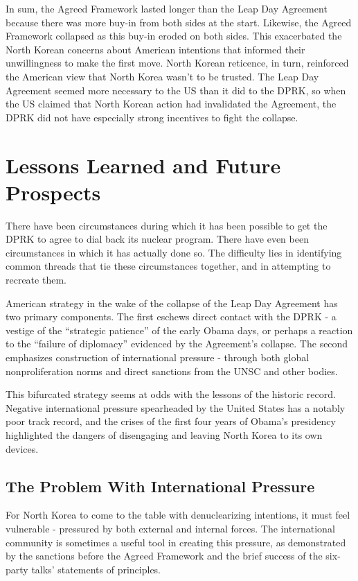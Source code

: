 In sum, the Agreed Framework lasted longer than the Leap Day Agreement because there was more buy-in from both sides at the start. Likewise, the Agreed Framework collapsed as this buy-in eroded on both sides. This exacerbated the North Korean concerns about American intentions that informed their unwillingness to make the first move. North Korean reticence, in turn, reinforced the American view that North Korea wasn't to be trusted. The Leap Day Agreement seemed more necessary to the US than it did to the DPRK, so when the US claimed that North Korean action had invalidated the Agreement, the DPRK did not have especially strong incentives to fight the collapse.

\section{Lessons Learned and Future Prospects}

There have been circumstances during which it has been possible to get the DPRK to agree to dial back its nuclear program. There have even been circumstances in which it has actually done so. The difficulty lies in identifying common threads that tie these circumstances together, and in attempting to recreate them.

American strategy in the wake of the collapse of the Leap Day Agreement has two primary components. The first eschews direct contact with the DPRK - a vestige of the ``strategic patience'' of the early Obama days, or perhaps a reaction to the ``failure of diplomacy'' evidenced by the Agreement's collapse. The second emphasizes construction of international pressure - through both global nonproliferation norms and direct sanctions from the UNSC and other bodies.

This bifurcated strategy seems at odds with the lessons of the historic record. Negative international pressure spearheaded by the United States has a notably poor track record, and the crises of the first four years of Obama's presidency highlighted the dangers of disengaging and leaving North Korea to its own devices.

\subsection{The Problem With International Pressure}

For North Korea to come to the table with denuclearizing intentions, it must feel vulnerable - pressured by both external and internal forces. The international community is sometimes a useful tool in creating this pressure, as demonstrated by the sanctions before the Agreed Framework and the brief success of the six-party talks' statements of principles. 


